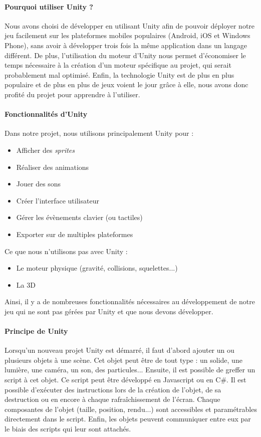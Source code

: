 \paragraph{Pourquoi utiliser Unity ?}

Nous avons choisi de développer en utilisant Unity afin de pouvoir déployer notre jeu facilement sur les plateformes mobiles populaires (Android, iOS et Windows Phone), sans avoir à développer trois fois la même application dans un langage différent. De plus, l'utilisation du moteur d'Unity nous permet d'économiser le temps nécessaire à la création d'un moteur spécifique au projet, qui serait probablement mal optimisé. Enfin, la technologie Unity est de plus en plus populaire et de plus en plus de jeux voient le jour grâce à elle, nous avons donc profité du projet pour apprendre à l'utiliser.
 
\paragraph{Fonctionnalités d'Unity}
Dans notre projet, nous utilisons principalement Unity pour :
\begin{itemize}
\item Afficher des \textit{sprites}
\item Réaliser des animations
\item Jouer des sons
\item Créer l'interface utilisateur
\item Gérer les évènements clavier (ou tactiles)
\item Exporter sur de  multiples plateformes
\end{itemize}
Ce que nous n'utilisons pas avec Unity :
\begin{itemize}
\item Le moteur physique (gravité, collisions, squelettes...)
\item La 3D
\end{itemize}
Ainsi, il y a de nombreuses fonctionnalités nécessaires au développement de notre jeu qui ne sont pas gérées par Unity et que nous devons développer.
 
\paragraph{Principe de Unity}
Lorsqu'un nouveau projet Unity est démarré, il faut d'abord ajouter un ou plusieurs objets à une scène. Cet objet peut être de tout type : un solide, une lumière, une caméra, un son, des particules... Ensuite, il est possible de greffer un script à cet objet. Ce script peut être développé en Javascript ou en C\#. Il est possible d'exécuter des instructions lors de la création de l'objet, de sa destruction ou en encore à chaque rafraîchissement de l'écran. Chaque composantes de l'objet (taille, position, rendu...) sont accessibles et paramétrables directement dans le script. Enfin, les objets peuvent communiquer entre eux par le biais des scripts qui leur sont attachés.

